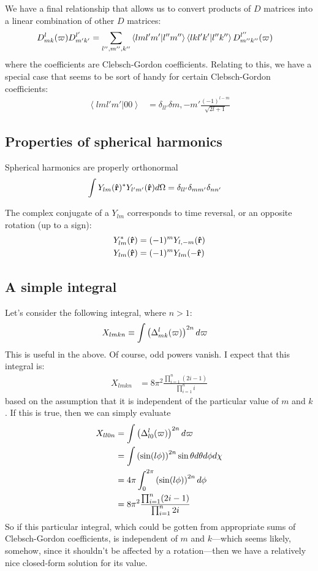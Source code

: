 \documentclass[letterpaper,twocolumn,amsmath,amssymb,pre]{revtex4-1}
\begin{document}
We have a final relationship that allows us to convert products of $D$
matrices into a linear combination of other $D$ matrices:
\begin{align}
  D^{l}_{mk}(\mathbf{\varpi})D^{l'}_{m'k'} &=
  \sum_{l'', m'', k''} \left<lml'm' | l''m''\right>
  \left<lkl'k' | l''k''\right> D^{l''}_{m''k''}(\mathbf{\varpi})
\end{align}
where the coefficients are Clebsch-Gordon coefficients.  Relating to
this, we have a special case that seems to be sort of handy for
certain Clebsch-Gordon coefficients:
\begin{align}
  \left< lm l'm' | 00 \right> &= \delta_{ll'}\delta{m,-m'}\frac{(-1)^{l-m}}{\sqrt{2l+1}}
\end{align}

\subsection{Properties of spherical harmonics}

Spherical harmonics are properly orthonormal
\begin{align}
  \int Y_{lm}(\mathbf{\hat{r}})^{*}Y_{l'm'}(\mathbf{\hat{r}}) d\Omega
  &= \delta_{ll'}\delta_{mm'}\delta_{nn'}
\end{align}

The complex conjugate of a $Y_{lm}$ corresponds to time reversal, or
an opposite rotation (up to a sign):
\begin{align}
  Y_{lm}^{*}(\mathbf{\hat{r}}) &= (-1)^{m} Y_{l,-m}(\mathbf{\hat{r}}) \\
  Y_{lm}(\mathbf{\hat{r}}) &= (-1)^{m} Y_{lm}(-\mathbf{\hat{r}})
\end{align}

\subsection{A simple integral}
Let's consider the following integral, where $n>1$:
\begin{align}
  X_{lmkn} &\equiv \int \left(\Delta^{l}_{mk}(\mathbf{\varpi})\right)^{2n} d\mathbf{\varpi}
\end{align}
This is useful in the above.  Of course, odd powers vanish.  I expect
that this integral is:
\begin{align}
  X_{lmkn} &=  8\pi^2 \frac{\prod_{i=1}^{n} (2i-1) }{ \prod_{i=1}^{n} i}
\end{align}
based on the assumption that it is independent of the particular value
of $m$ and $k$.  If this is true, then we can simply evaluate
\begin{align}
  X_{ll0n} &= \int \left(\Delta^{l}_{l0}(\mathbf{\varpi})\right)^{2n} d\mathbf{\varpi} \\
  &= \int \left( \sin(l\phi) \right)^{2n} \sin\theta d\theta d\phi
  d\chi \\
  &= 4\pi \int_0^{2\pi} \left( \sin(l\phi) \right)^{2n} d\phi \\
  &=  8\pi^2 \frac{\prod_{i=1}^{n} (2i-1) }{ \prod_{i=1}^{n} 2i}
\end{align}
So if this particular integral, which could be gotten from appropriate
sums of Clebsch-Gordon coefficients, is independent of $m$ and
$k$---which seems likely, somehow, since it shouldn't be affected by a
rotation---then we have a relatively nice closed-form solution for its
value.
\end{document}
